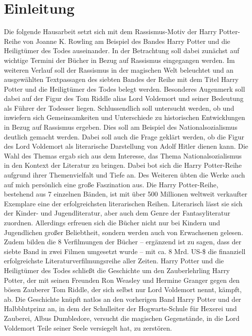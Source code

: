 \section{Einleitung} 
Die folgende Hausarbeit setzt sich mit dem Rassismus-Motiv der \glqq Harry Potter\grqq{}-Reihe von Joanne K. Rowling am Beispiel des Bandes \glqq Harry Potter und die Heiligtümer des Todes\grqq{} auseinander.
In der Betrachtung soll dabei zunächst auf wichtige Termini der Bücher in Bezug auf Rassismus eingegangen werden. 
Im weiteren Verlauf soll der Rassismus in der magischen Welt beleuchtet und an ausgewählten Textpassagen des siebten Bandes der Reihe mit dem Titel \glqq Harry Potter und die Heiligtümer des Todes\grqq{} belegt werden. 
Besonderes Augenmerk soll dabei auf der Figur des Tom Riddle alias Lord Voldemort und seiner Bedeutung als Führer der Todesser liegen.
Schlussendlich soll untersucht werden, ob und inwiefern sich Gemeinsamkeiten und Unterschiede zu historischen Entwicklungen in Bezug auf Rassismus ergeben. 
Dies soll am Beispiel des Nationalsozialismus deutlich gemacht werden. 
Dabei soll auch die Frage geklärt werden, ob die Figur des Lord Voldemort als  literarische Darstellung von Adolf Hitler dienen kann. 
Die Wahl des Themas ergab sich aus dem Interesse, das Thema \glqq Nationalsozialismus\grqq{} in den Kontext der Literatur zu bringen. 
Dabei bot sich die \glqq Harry Potter\grqq-Reihe aufgrund ihrer Themenvielfalt und Tiefe an. 
Des Weiteren übten die Werke auch auf mich persönlich eine große Faszination aus. 
Die \glqq Harry Potter\grqq-Reihe, bestehend aus 7 einzelnen Bänden, ist mit über 500 Millionen weltweit verkaufter Exemplare eine der erfolgreichsten literarischen Reihen. 
Literarisch lässt sie sich der Kinder- und Jugendliteratur, aber auch dem Genre der Fantasyliteratur zuordnen. 
Allerdings erfreuen sich die Bücher nicht nur bei Kindern und Jugendlichen großer Beliebtheit, sondern werden auch von Erwachsenen gelesen.
 Zudem bilden die 8 Verfilmungen der Bücher – ergänzend ist zu sagen, dass der siebte Band in zwei Filmen umgesetzt wurde – mit ca. 8 Mrd. US-\$ die finanziell erfolgreichste Literaturverfilmungsreihe aller Zeiten.
\glqq Harry Potter und die Heiligtümer des Todes\grqq{} schließt die Geschichte um den Zauberlehrling Harry Potter, der mit seinen Freunden Ron Weasley und Hermine Granger gegen den bösen Zauberer Tom Riddle, der sich selbst nur \glqq Lord Voldemort\grqq{} nennt, kämpft, ab.
Die Geschichte knüpft natlos an den vorherigen Band \glqq Harry Potter und der Halbblutprinz\grqq{} an, in dem der Schulleiter der Hogwarts-Schule für Hexerei und Zauberei, Albus Dumbledore, versucht die magischen Gegenstände, in die Lord Voldemort Teile seiner Seele versiegelt hat, zu zerstören. 
